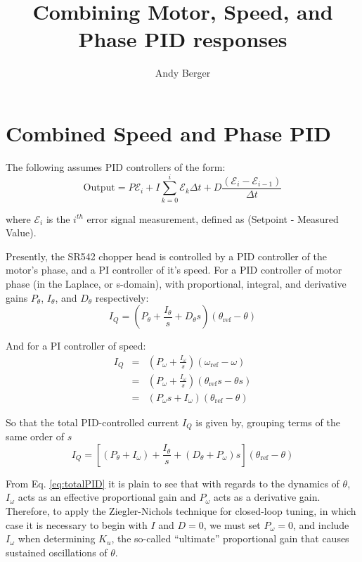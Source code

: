 \documentclass[11pt]{article} %
\title{Combining Motor, Speed, and Phase PID responses}
\author{Andy Berger}
\begin{document}
\maketitle

\section{Combined Speed and Phase PID}
The following assumes PID controllers of the form:
\begin{equation}
\mathrm{Output} = P \mathcal{E}_i + I \sum_{k=0}^i \mathcal{E}_k \Delta t + D \frac{(\mathcal{E}_i - \mathcal{E}_{i-1})}{\Delta t}
\end{equation}

\noindent where $\mathcal{E}_i$ is the $i^{th}$ error signal measurement, defined as (Setpoint - Measured Value).

Presently, the SR542 chopper head is controlled by a PID controller of the motor's phase, and a PI controller of it's speed. For a PID controller of motor phase (in the Laplace, or s-domain), with proportional, integral, and derivative gains $P_{\theta}$, $I_{\theta}$, and $D_{\theta}$ respectively:
\begin{equation}
I_Q = \left(P_{\theta} + \frac{I_{\theta}}{s}  + D_{\theta}s\right) (\theta_\mathrm{ref} - \theta)
\end{equation}

\noindent And for a PI controller of speed:
\begin{eqnarray}
I_Q &=& \left(P_{\omega} + \frac{I_{\omega}}{s}\right) (\omega_\mathrm{ref} - \omega) \nonumber \\
&=& \left(P_{\omega} + \frac{I_{\omega}}{s}\right) (\theta_\mathrm{ref} s - \theta s) \nonumber \\
&=& \left(P_{\omega} s + I_{\omega}\right) (\theta_\mathrm{ref} - \theta)
\end{eqnarray}

\noindent So that the total PID-controlled current $I_Q$ is given by, grouping terms of the same order of $s$
\begin{equation}
I_Q = \left[(P_{\theta} + I_{\omega}) + \frac{I_{\theta}}{s}  + (D_{\theta} + P_{\omega})s\right] (\theta_\mathrm{ref} - \theta) 
\label{eq:totalPID}
\end{equation}

\noindent From Eq. \ref{eq:totalPID} it is plain to see that with regards to the dynamics of $\theta$, $I_\omega$ acts as an effective proportional gain and $P_\omega$ acts as a derivative gain. Therefore, to apply the Ziegler-Nichols technique for closed-loop tuning, in which case it is necessary to begin with $I$ and $D = 0$, we must set $P_\omega = 0$, and include $I_\omega$ when determining $K_u$, the so-called ``ultimate'' proportional gain that causes sustained oscillations of $\theta$.
\end{document}
